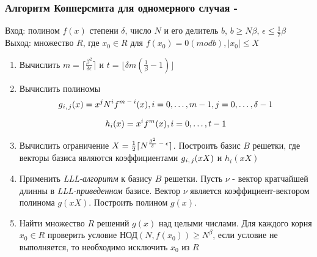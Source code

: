   \subsubsection{Алгоритм Копперсмита для одномерного случая - \cite[страницы 321-327]{may10}}
    Вход: полином {$f(x)$} степени {$\delta$}, число {$N$} и его делитель {$b$}, {$b \ge N\beta$}, {$\epsilon \le \frac{1}{7} \beta$} \\
    Выход: множество {$R$}, где {$x_0 \in R$} для {$f(x_0) = 0 (mod b), |x_0| \le X$}
    
    \begin{enumerate}
      \item Вычислить {$m = \lceil \frac{\beta^2}{\delta \epsilon} \rceil$} и {$t = \lfloor \delta m (\frac{1}{\beta} - 1) \rfloor$}
      \item Вычислить полиномы
	\begin{equation}
	  \textit{{$ g\textsubscript{{$i,j$}}(x) = x^j N^i f\textsuperscript{{$m-i$}}(x), i=0, \dots, m-1, j=0, \dots, \delta-1 $}}
	\end{equation}
	
	\begin{equation}
	  \textit{{$ h_i(x) = x^i f^m(x), i = 0, \dots, t-1 $}}
	\end{equation}
	
      \item Вычислить ограничение {$X = \frac{1}{2} \lceil N\textsuperscript{{$\frac{\beta^2}{\delta} - \epsilon$}} \rceil$}. Построить базис {$B$} решетки,
	где векторы базиса являются коэффициентами {$g\textsubscript{{$i,j$}}(x X)$} и {$h_i(x X)$}
      \item Применить \textit{LLL-алгоритм} к базису {$B$} решетки. Пусть {$\nu$} - вектор кратчайшей длинны в \textit{LLL-приведенном} базисе. Вектор {$\nu$}
	является коэффициент-вектором полинома {$g(xX)$}. Построить полином {$g(x)$}.
      \item Найти множество {$R$} решений {$g(x)$} над целыми числами. Для каждого корня {$x_0 \in R$} проверить условие НОД{$(N, f(x_0)) \ge N^\beta$}, 
	если условие не выполняется, то необходимо исключить {$x_0$} из {$R$}
    \end{enumerate}    